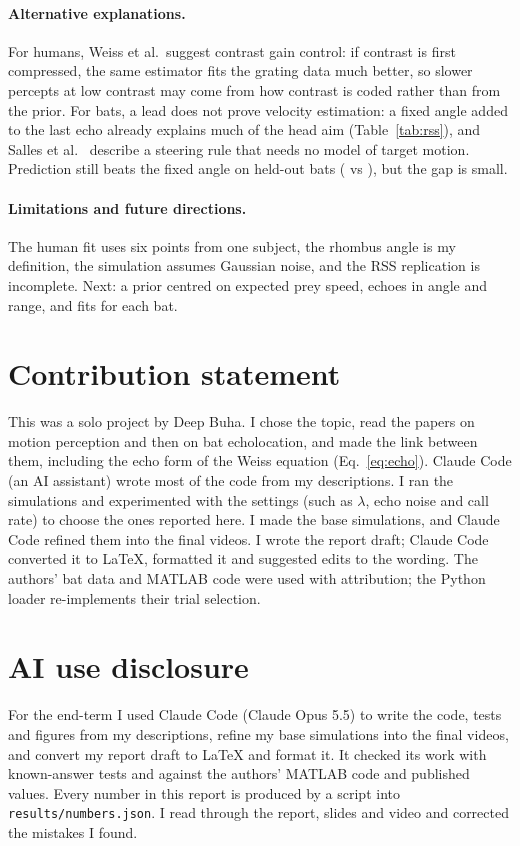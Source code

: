 \documentclass[10pt,twocolumn]{article}
\begin{document}
\paragraph{Alternative explanations.} For humans, Weiss et al.\ suggest contrast gain control: if contrast is first compressed, the same estimator fits the grating data much better, so slower percepts at low contrast may come from how contrast is coded rather than from the prior. For bats, a lead does not prove velocity estimation: a fixed angle added to the last echo already explains much of the head aim (Table~\ref{tab:rss}), and Salles et al.\ \cite{salles2021} describe a steering rule that needs no model of target motion. Prediction still beats the fixed angle on held-out bats (\realCvPredictive{} vs \realCvFixed), but the gap is small.

\paragraph{Limitations and future directions.} The human fit uses six points from one subject, the rhombus angle is my definition, the simulation assumes Gaussian noise, and the RSS replication is incomplete. Next: a prior centred on expected prey speed, echoes in angle and range, and fits for each bat.

\small



\section*{Contribution statement}
This was a solo project by Deep Buha. I chose the topic, read the papers on motion perception and then on bat echolocation, and made the link between them, including the echo form of the Weiss equation (Eq.~\ref{eq:echo}). Claude Code (an AI assistant) wrote most of the code from my descriptions. I ran the simulations and experimented with the settings (such as $\lambda$, echo noise and call rate) to choose the ones reported here. I made the base simulations, and Claude Code refined them into the final videos. I wrote the report draft; Claude Code converted it to LaTeX, formatted it and suggested edits to the wording. The authors' bat data and MATLAB code \cite{sallesrepo} were used with attribution; the Python loader re-implements their trial selection.

\section*{AI use disclosure}
For the end-term I used Claude Code (Claude Opus 5.5) to write the code, tests and figures from my descriptions, refine my base simulations into the final videos, and convert my report draft to LaTeX and format it. It checked its work with known-answer tests and against the authors' MATLAB code and published values. Every number in this report is produced by a script into \texttt{results/numbers.json}. I read through the report, slides and video and corrected the mistakes I found.
\end{document}
